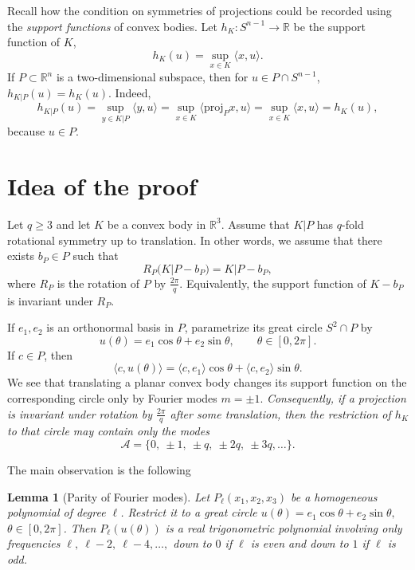 \documentclass[11pt]{article}
\newtheorem{lemma}[theorem]{Lemma}
\theoremstyle{definition}
\begin{document}
Recall  how the condition on symmetries of projections could be recorded using the {\it support functions} of convex bodies.
Let \(h_K:S^{n-1}\to\mathbb R\) be the support function of \(K\),
$$
h_K(u)=\sup_{x\in K}\langle x,u\rangle.
$$
If \(P\subset\mathbb R^n\) is a two-dimensional subspace, then for \(u\in P\cap S^{n-1}\),
$
h_{K|P}(u)=h_K(u).
$
Indeed,
\[
h_{K|P}(u)
=
\sup_{y\in K|P}\langle y,u\rangle
=
\sup_{x\in K}\langle \textrm{proj}_P x,u\rangle
=
\sup_{x\in K}\langle x,u\rangle
=
h_K(u),
\]
because \(u\in P\).







\section{Idea of the proof}

Let $q\ge 3$ and let $K$ be a convex body in ${\mathbb R^3}$. 
Assume that \(K|P\) has \(q\)-fold rotational symmetry up to translation. In other words, we assume that there exists \(b_P\in P\) such that
\[
R_P(K|P-b_P)=K|P-b_P,
\]
where \(R_P\) is
the rotation of \(P\) by \(\frac{2\pi}{q}\). 
Equivalently, the support function of $K-b_P$
is invariant under \(R_P\).

If \(e_1,e_2\) is an  orthonormal basis in \(P\), parametrize its great circle $S^2\cap P$ by
\begin{equation}\label{lpM2}
	u(\theta)=e_1\cos\theta+e_2\sin\theta,\qquad \theta\in[0,2\pi].
\end{equation}
If \(c\in P\), then
\[
\langle c,u(\theta)\rangle
=
\langle c,e_1\rangle\cos\theta+\langle c,e_2\rangle\sin\theta.
\]
We see that translating a planar convex body changes its support function on the corresponding
circle only by Fourier modes \(m=\pm1\).
{\it  Consequently, if a projection is invariant under rotation by \(\frac{2\pi}{q}\) after some
translation, then the restriction of \(h_K\) to that circle may contain only the modes}
\begin{equation}\label{modes}
{\mathcal A}=\{0,\ \pm1,\ \pm q,\ \pm2q,\ \pm3q,\dots\}.
\end{equation}

The main observation is the following 


\begin{lemma}[Parity of Fourier modes]\label{lem:parity}
Let \(P_\ell(x_1,x_2,x_3)\) be a homogeneous polynomial of degree \(\ell\).
Restrict it to a great circle
$
u(\theta)=e_1\cos\theta+e_2\sin\theta,
$ $\theta\in [0,2\pi]$.
Then \(P_\ell(u(\theta))\) is a real trigonometric polynomial involving only frequencies
$
\ell,\ \ell-2,\ \ell-4,\dots,
$
down to \(0\) if \(\ell\) is even and down to \(1\) if \(\ell\) is odd.
\end{lemma}
\end{document}
